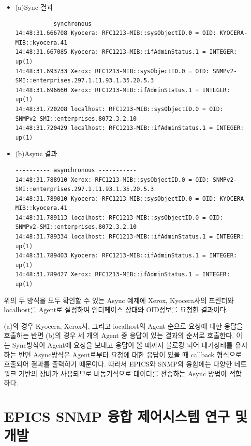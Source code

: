 \documentclass[11pt
  , a4paper
  , article
  , oneside
]{memoir}
\begin{document}
\clearpage

\begin{itemize}
\item (a)Sync 결과\\
{\scriptsize
\begin{lstlisting}[style=termstyle]
---------- synchronous -----------
14:48:31.666708 Kyocera: RFC1213-MIB::sysObjectID.0 = OID: KYOCERA-MIB::kyocera.41
14:48:31.667085 Kyocera: RFC1213-MIB::ifAdminStatus.1 = INTEGER: up(1)
14:48:31.693733 Xerox: RFC1213-MIB::sysObjectID.0 = OID: SNMPv2-SMI::enterprises.297.1.11.93.1.35.20.5.3
14:48:31.696660 Xerox: RFC1213-MIB::ifAdminStatus.1 = INTEGER: up(1)
14:48:31.720208 localhost: RFC1213-MIB::sysObjectID.0 = OID: SNMPv2-SMI::enterprises.8072.3.2.10
14:48:31.720429 localhost: RFC1213-MIB::ifAdminStatus.1 = INTEGER: up(1)
\end{lstlisting}
}
\item (b)Async 결과\\
{\scriptsize
\begin{lstlisting}[style=termstyle]
---------- asynchronous -----------
14:48:31.788910 Xerox: RFC1213-MIB::sysObjectID.0 = OID: SNMPv2-SMI::enterprises.297.1.11.93.1.35.20.5.3
14:48:31.789010 Kyocera: RFC1213-MIB::sysObjectID.0 = OID: KYOCERA-MIB::kyocera.41
14:48:31.789113 localhost: RFC1213-MIB::sysObjectID.0 = OID: SNMPv2-SMI::enterprises.8072.3.2.10
14:48:31.789334 localhost: RFC1213-MIB::ifAdminStatus.1 = INTEGER: up(1)
14:48:31.789403 Kyocera: RFC1213-MIB::ifAdminStatus.1 = INTEGER: up(1)
14:48:31.789427 Xerox: RFC1213-MIB::ifAdminStatus.1 = INTEGER: up(1)
\end{lstlisting}
}
\end{itemize}

위의 두 방식을 모두 확인할 수 있는 Async 예제에 Xerox, Kyocera사의 프린터와 localhost를 Agent로 설정하여 인터페이스 상태와 OID정보를 요청한 결과이다.

(a)의 경우 Kyocera, Xerox사, 그리고 localhost의 Agent 순으로 요청에 대한 응답을 호출하는 반면 (b)의 경우 세 개의 Agent 중 응답이 있는 결과의 순서로 호출한다. 이는 Sync방식이 Agent에 요청을 보내고 응답이 올 때까지 블로킹 되어 대기상태를 유지하는 반면 Async방식은 Agent로부터 요청에 대한 응답이 있을 때 callback 형식으로 호출되어 결과를 출력하기 때문이다. 따라서 EPICS와 SNMP의 융합에는 다양한 네트워크 기반의 장비가 사용되므로 비동기식으로 데이터를 전송하는 Async 방법이 적합하다.



\section{EPICS SNMP 융합 제어시스템 연구 및 개발}
\end{document}
